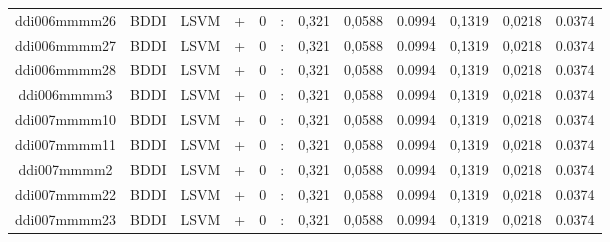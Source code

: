 \documentclass[a4paper]{article}
\begin{document}
\begin{landscape}
\begin{center}
\begin{tabular}{ |c|c|c|c|c|c|c|c|c|c|c|c|}
 	
 
 	
 		
 		\small{ ddi006mmmm26 } & BDDI & LSVM & +  &  0 &  :  &  0,321 & 0,0588 & 0.0994  &  0,1319 & 0,0218 & 0.0374 \\
 		

 	
 
 	
 		
 		\small{ ddi006mmmm27 } & BDDI & LSVM & +  &  0 &  :  &  0,321 & 0,0588 & 0.0994  &  0,1319 & 0,0218 & 0.0374 \\
 		

 	
 
 	
 		
 		\small{ ddi006mmmm28 } & BDDI & LSVM & +  &  0 &  :  &  0,321 & 0,0588 & 0.0994  &  0,1319 & 0,0218 & 0.0374 \\
 		

 	
 
 	
 		
 		\small{ ddi006mmmm3 } & BDDI & LSVM & +  &  0 &  :  &  0,321 & 0,0588 & 0.0994  &  0,1319 & 0,0218 & 0.0374 \\
 		

 	
 
 	
 		
 		\small{ ddi007mmmm10 } & BDDI & LSVM & +  &  0 &  :  &  0,321 & 0,0588 & 0.0994  &  0,1319 & 0,0218 & 0.0374 \\
 		

 	
 
 	
 		
 		\small{ ddi007mmmm11 } & BDDI & LSVM & +  &  0 &  :  &  0,321 & 0,0588 & 0.0994  &  0,1319 & 0,0218 & 0.0374 \\
 		

 	
 
 	
 		
 		\small{ ddi007mmmm2 } & BDDI & LSVM & +  &  0 &  :  &  0,321 & 0,0588 & 0.0994  &  0,1319 & 0,0218 & 0.0374 \\
 		

 	
 
 	
 		
 		\small{ ddi007mmmm22 } & BDDI & LSVM & +  &  0 &  :  &  0,321 & 0,0588 & 0.0994  &  0,1319 & 0,0218 & 0.0374 \\
 		

 	
 
 	
 		
 		\small{ ddi007mmmm23 } & BDDI & LSVM & +  &  0 &  :  &  0,321 & 0,0588 & 0.0994  &  0,1319 & 0,0218 & 0.0374 \\
 		


\end{tabular}
\end{center}
\end{landscape}
\end{document}
